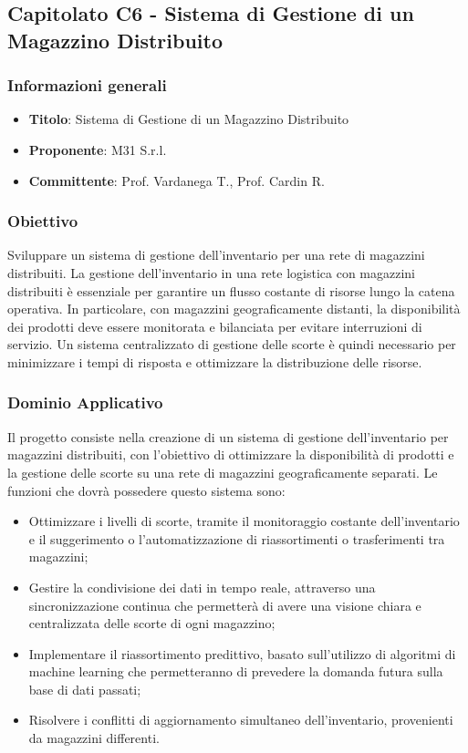 \subsection{Capitolato C6 - Sistema di Gestione di un Magazzino
Distribuito}
    \subsubsection{Informazioni generali}
        \begin{itemize}
            \item \textbf{Titolo}: Sistema di Gestione di un Magazzino
Distribuito
            \item \textbf{Proponente}: M31 S.r.l.
            \item \textbf{Committente}: Prof. Vardanega T., Prof. Cardin R.
        \end{itemize}
    \subsubsection{Obiettivo}
    Sviluppare un sistema di gestione dell'inventario per una rete di magazzini distribuiti.
La gestione dell’inventario in una rete logistica con magazzini distribuiti è essenziale per garantire un flusso costante di risorse lungo la catena operativa. In particolare, con magazzini geograficamente distanti, la disponibilità dei prodotti deve essere monitorata e bilanciata per evitare interruzioni di servizio. Un sistema centralizzato di gestione delle scorte è quindi necessario per minimizzare i tempi di risposta e ottimizzare la distribuzione delle risorse.

     \subsubsection{Dominio Applicativo}
    Il progetto consiste nella creazione di un sistema di gestione dell'inventario per magazzini distribuiti, con l’obiettivo di ottimizzare la disponibilità di prodotti e la gestione delle scorte su una rete di magazzini geograficamente separati.
Le funzioni che dovrà possedere questo sistema sono:

\begin{itemize}
    \item Ottimizzare i livelli di scorte, tramite il monitoraggio costante dell'inventario e il suggerimento o l'automatizzazione di riassortimenti o trasferimenti tra magazzini;
    \item Gestire la condivisione dei dati in tempo reale, attraverso una sincronizzazione continua che permetterà di avere una visione chiara e centralizzata delle scorte di ogni magazzino;
    \item Implementare il riassortimento predittivo, basato sull’utilizzo di algoritmi di machine learning che permetteranno di prevedere la domanda futura sulla base di dati passati;
    \item Risolvere i conflitti di aggiornamento simultaneo dell’inventario, provenienti da magazzini differenti.
\end{itemize}
